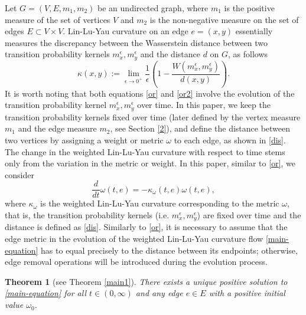 \documentclass{article}
\newtheorem{theorem}{Theorem}[section]
\begin{document}
Let $G=(V,E,m_1,m_2)$ be an undirected graph, where $m_1$ is the positive measure of the set of vertices $V$ and $m_2$ is the non-negative measure on the set of edges $E\subset V\times V$.  Lin-Lu-Yau curvature on an edge $e=(x,y)$ essentially measures the discrepancy between the Wasserstein distance between two transition probability kernels $m_x^{\epsilon},m_y^{\epsilon}$ and the distance $d$ on $G$, as follows \begin{equation*}\label{lly}
    \kappa(x,y):=\lim_{\epsilon\rightarrow 0^+}\frac{1}{\epsilon}\left(1-\frac{W(m_x^\epsilon,m_y^\epsilon)}{d(x,y)}\right).
\end{equation*}
It is worth noting that both equations \eqref{or} and \eqref{or2} involve the evolution of the transition probability kernel $m_x^\epsilon,m_y^\epsilon$ over time. In this paper, we keep the transition probability kernels fixed over time (later defined by the vertex measure $m_1$  and the edge measure $m_2$, see Section \ref{2}), and define the distance between two vertices by assigning a weight or metric $\omega$ to each edge, as shown in \eqref{dis}. The change in the weighted Lin-Lu-Yau curvature with respect to time stems only from the variation in the metric or weight. 
In this paper, similar to \eqref{or}, we consider 
\begin{equation}\label{main-equation}
    \frac{d}{dt}\omega(t,e)=-\kappa_{\omega}(t,e)\omega(t,e),
\end{equation}
where $\kappa_{\omega}$  is the weighted Lin-Lu-Yau curvature corresponding to the metric $\omega$, that is, the transition probability kernels (i.e. $m_x^\epsilon,m_y^\epsilon$) are fixed over time and the distance is defined as \eqref{dis}. Similarly to \eqref{or}, it is necessary to assume that the edge metric in the evolution of the weighted Lin-Lu-Yau curvature flow \eqref{main-equation}  has to equal precisely to the distance between its endpoints; otherwise, edge removal operations will be introduced during the evolution process. 
\begin{theorem}[see Theorem \ref{main1}] There exists a  unique positive solution to 
\eqref{main-equation}
for all $t\in(0,\infty)$ and any edge $e\in E$ with a positive initial value $\omega_0$.
\end{theorem}
\end{document}
